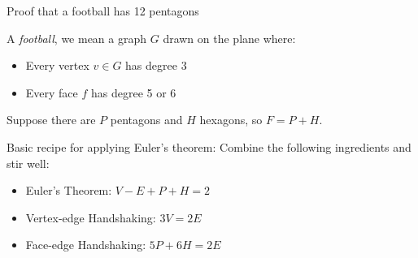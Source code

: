 \documentclass{beamer}
\begin{document}
\begin{frame}{Proof that a football has 12 pentagons}
\begin{definition}
  A \emph{football}, we mean a graph $G$ drawn on the plane where:
  \begin{itemize}
  \item Every vertex $v\in G$ has degree 3
  \item Every face $f$ has degree 5 or 6
  \end{itemize}
\end{definition}

  Suppose there are $P$ pentagons and $H$ hexagons, so $F=P+H$.

\begin{block}{Basic recipe for applying Euler's theorem:}
Combine the following ingredients and stir well:
  \begin{itemize}
\item  Euler's Theorem: $V-E+P+H=2$
\item Vertex-edge Handshaking: $3V=2E$
\item Face-edge Handshaking: $5P+6H=2E$
  \end{itemize}
\end{block}


  

\end{frame}
  
\end{document}
